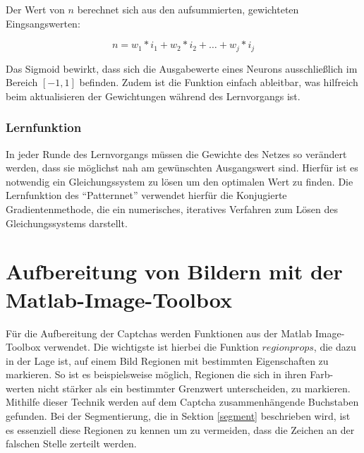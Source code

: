 Der Wert von $n$ berechnet sich aus den aufsummierten, gewichteten
Eingsangswerten:

\begin{equation}
  n = w_1 * i_1 + w_2 * i_2 + \ldots  + w_j * i_j
\end{equation}

Das Sigmoid bewirkt, dass sich die Ausgabewerte eines Neurons ausschließlich
im Bereich $[-1,1]$ befinden. Zudem ist die Funktion einfach ableitbar, was
hilfreich beim aktualisieren der Gewichtungen während des Lernvorgangs ist.

\subsubsection{Lernfunktion}

In jeder Runde des Lernvorgangs müssen die Gewichte des Netzes so verändert werden,
dass sie möglichst nah am gewünschten Ausgangswert sind. Hierfür ist es
notwendig ein Gleichungssystem zu lösen um den optimalen Wert zu finden. Die Lernfunktion
des ``Patternnet'' verwendet hierfür die Konjugierte Gradientenmethode, die ein
numerisches, iteratives Verfahren zum Lösen des Gleichungssystems darstellt.


\section{Aufbereitung von Bildern mit der Matlab-Image-Toolbox}
\label{images}

Für die Aufbereitung der Captchas werden Funktionen aus der Matlab
Image-Toolbox verwendet. Die wichtigste ist hierbei die Funktion $regionprops$,
die dazu in der Lage ist, auf einem Bild Regionen mit bestimmten Eigenschaften
zu markieren. So ist es beispielsweise möglich, Regionen die sich in ihren Farb-
werten nicht stärker als ein bestimmter Grenzwert unterscheiden, zu markieren.
Mithilfe dieser Technik werden auf dem Captcha zusammenhängende Buchstaben 
gefunden. Bei der Segmentierung, die in Sektion \ref{segment} beschrieben wird,
ist es essenziell diese Regionen zu kennen um zu vermeiden, dass die Zeichen an
der falschen Stelle zerteilt werden.

